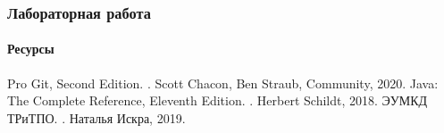\documentclass[aspectratio=169, 12pt]{beamer}
\begin{document}
\begin{frame}[t]
    \frametitle{Лабораторная работа }
    \framesubtitle{Ресурсы}
    \begin{thebibliography}{10}
        \beamertemplatebookbibitems
        Pro Git, Second Edition.
        .
        \newblock Scott Chacon, Ben Straub, Community, 2020.
        Java: The Complete Reference, Eleventh Edition.
        .
        \newblock Herbert Schildt, 2018.
        ЭУМКД ТРиТПО.
        .
        \newblock Наталья Искра, 2019.
    \end{thebibliography}
\end{frame}
\end{document}
